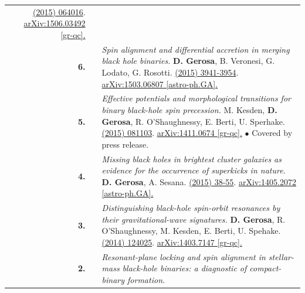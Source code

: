 {\begin{longtable}{rp{0.3cm}p{15.8cm}}
\newline{}
\href{http://dx.doi.org/10.1103/PhysRevD.92.064016}{\prd 92 (2015) 064016}. \href{https://arxiv.org/abs/1506.03492}{arXiv:1506.03492 [gr-qc].}
\vspace{0.09cm}\\
%
\textbf{6.} & & \textit{Spin alignment and differential accretion in merging black hole binaries.}
\newline{}
\textbf{D. Gerosa}, B. Veronesi, G. Lodato, G. Rosotti.
\newline{}
\href{http://dx.doi.org/10.1093/mnras/stv1214}{\mnras 451 (2015) 3941-3954}. \href{https://arxiv.org/abs/1503.06807}{arXiv:1503.06807 [astro-ph.GA].}
\vspace{0.09cm}\\
%
\textbf{5.} & & \textit{Effective potentials and morphological transitions for binary black-hole spin precession.}
\newline{}
M. Kesden, \textbf{D. Gerosa}, R. O'Shaughnessy, E. Berti, U. Sperhake.
\newline{}
\href{http://dx.doi.org/10.1103/PhysRevLett.114.081103}{\prl 114 (2015) 081103}. \href{https://arxiv.org/abs/1411.0674}{arXiv:1411.0674 [gr-qc].}
\newline{}
\textcolor{color1}{$\bullet$} Covered by press release.
\vspace{0.09cm}\\
%
\textbf{4.} & & \textit{Missing black holes in brightest cluster galaxies as evidence for the occurrence of superkicks in nature.}
\newline{}
\textbf{D. Gerosa}, A. Sesana.
\newline{}
\href{http://dx.doi.org/10.1093/mnras/stu2049}{\mnras 446 (2015) 38-55}. \href{https://arxiv.org/abs/1405.2072}{arXiv:1405.2072 [astro-ph.GA].}
\vspace{0.09cm}\\
%
\textbf{3.} & & \textit{Distinguishing black-hole spin-orbit resonances by their gravitational-wave signatures.}
\newline{}
\textbf{D. Gerosa}, R. O'Shaughnessy, M. Kesden, E. Berti, U. Spehake.
\newline{}
\href{http://dx.doi.org/10.1103/PhysRevD.89.124025}{\prd 89 (2014) 124025}. \href{https://arxiv.org/abs/1403.7147}{arXiv:1403.7147 [gr-qc].}
\vspace{0.09cm}\\
%
\textbf{2.} & & \textit{Resonant-plane locking and spin alignment in stellar-mass black-hole binaries: a diagnostic of compact-binary formation.}

\end{longtable}}
